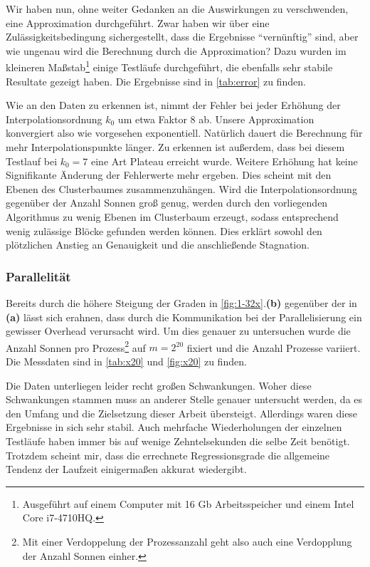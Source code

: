   Wir haben nun, ohne weiter Gedanken an die Auswirkungen zu verschwenden, eine Approximation durchgeführt. Zwar haben wir über eine Zulässigkeitsbedingung sichergestellt, dass die Ergebnisse
  ``vernünftig'' sind, aber wie ungenau wird die Berechnung durch die Approximation? Dazu wurden im kleineren Maßstab\footnote{Ausgeführt auf einem Computer mit 16 Gb Arbeitsspeicher und einem Intel 
  Core i7-4710HQ.} einige Testläufe durchgeführt, die ebenfalls sehr stabile Resultate gezeigt haben. Die Ergebnisse sind in \autoref{tab:error} zu finden.
  
  Wie an den Daten zu erkennen ist, nimmt der Fehler bei jeder Erhöhung der Interpolationsordnung $k_0$ um etwa Faktor $8$ ab. Unsere Approximation konvergiert also wie vorgesehen exponentiell. Natürlich
  dauert die Berechnung für mehr Interpolationspunkte länger. Zu erkennen ist außerdem, dass bei diesem Testlauf bei $k_0=7$ eine Art Plateau erreicht wurde. Weitere Erhöhung hat keine Signifikante
  Änderung der Fehlerwerte mehr ergeben. Dies scheint mit den Ebenen des Clusterbaumes zusammenzuhängen. Wird die Interpolationsordnung gegenüber der Anzahl Sonnen groß genug, werden durch den
  vorliegenden Algorithmus zu wenig Ebenen im Clusterbaum erzeugt, sodass entsprechend wenig zulässige Blöcke gefunden werden können. Dies erklärt sowohl den plötzlichen Anstieg an Genauigkeit und
  die anschließende Stagnation.
  
  \subsubsection{Parallelität}
  
  Bereits durch die höhere Steigung der Graden in \autoref{fig:1-32x}.\textbf{(b)} gegenüber der in \textbf{(a)} lässt sich erahnen, dass durch die Kommunikation bei der Parallelisierung ein gewisser
  Overhead verursacht wird. Um dies genauer zu untersuchen wurde die Anzahl Sonnen pro Prozess\footnote{Mit einer Verdoppelung der Prozessanzahl geht also auch eine Verdopplung der Anzahl Sonnen 
  einher.} auf $m = 2^{20}$ fixiert und die Anzahl Prozesse variiert.  Die Messdaten sind in \autoref{tab:x20} und \autoref{fig:x20} zu finden. 
  
  Die Daten unterliegen leider recht großen Schwankungen. Woher diese Schwankungen stammen muss an anderer Stelle genauer untersucht werden, da es den Umfang und die Zielsetzung dieser Arbeit 
  übersteigt. Allerdings waren diese Ergebnisse in sich sehr stabil. Auch mehrfache Wiederholungen der einzelnen Testläufe haben immer bis auf wenige Zehntelsekunden die selbe Zeit benötigt. 
   Trotzdem scheint mir, dass die errechnete Regressionsgrade die allgemeine Tendenz der Laufzeit einigermaßen akkurat wiedergibt.
  
